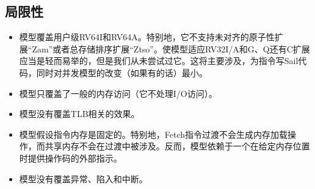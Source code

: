 \subsection{局限性}\label{sec:omm:limitations}
\begin{itemize}
\item 模型覆盖用户级RV64I和RV64A。特别地，它不支持未对齐的原子性扩展“Zam”或者总存储排序扩展“Ztso”。使模型适应RV32I/A和G、Q还有C扩展应当是轻而易举的，但是我们从未尝试过它。这将主要涉及，为指令写Sail代码，同时对并发模型的改变（如果有的话）最小。
\item 模型只覆盖了一般的内存访问（它不处理I/O访问）。  %
\item 模型没有覆盖TLB相关的效果。  %
\item 模型假设指令内存是固定的。特别地，Fetch指令过渡不会生成内存加载操作，而共享内存不会在过渡中被涉及。反而，模型依赖于一个在给定内存位置时提供操作码的外部指示。 %
\item 模型没有覆盖异常、陷入和中断。 %
\end{itemize}

